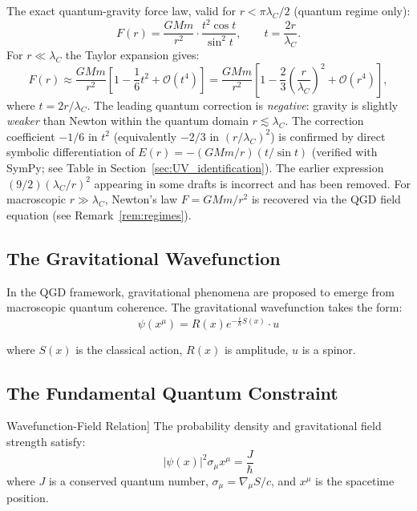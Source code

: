 \documentclass[11pt,a4paper]{article}
\theoremstyle{definition}
\theoremstyle{remark}
\begin{document}
	The exact quantum-gravity force law, valid for $r < \pi\lambda_C/2$ (quantum regime only):
	\begin{equation}
		F(r) = \frac{GMm}{r^2}\cdot\frac{t^2\cos t}{\sin^2 t}, \qquad t = \frac{2r}{\lambda_C}.
	\end{equation}
	For $r \ll \lambda_C$ the Taylor expansion gives:
	\begin{equation}
		F(r) \approx \frac{GMm}{r^2}\left[1 - \frac{1}{6}t^2 + \mathcal{O}(t^4)\right]
		           = \frac{GMm}{r^2}\left[1 - \frac{2}{3}\!\left(\frac{r}{\lambda_C}\right)^{\!2} + \mathcal{O}(r^4)\right],
		\label{eq:F_leading_corrected}
	\end{equation}
	where $t = 2r/\lambda_C$.  The leading quantum correction is \emph{negative}: gravity
	is slightly \emph{weaker} than Newton within the quantum domain $r \lesssim \lambda_C$.
	The correction coefficient $-1/6$ in $t^2$ (equivalently $-2/3$ in $(r/\lambda_C)^2$)
	is confirmed by direct symbolic differentiation of $E(r) = -(GMm/r)(t/\sin t)$
	(verified with SymPy; see Table in Section~\ref{sec:UV_identification}).
	The earlier expression $(9/2)(\lambda_C/r)^2$ appearing in some drafts is incorrect
	and has been removed.
	For macroscopic $r \gg \lambda_C$, Newton's law $F = GMm/r^2$ is recovered via the QGD field equation (see Remark~\ref{rem:regimes}).

	\subsection{The Gravitational Wavefunction}
		
		In the QGD framework, gravitational phenomena are proposed to emerge from macroscopic quantum coherence. The gravitational wavefunction takes the form:
		\begin{equation}\label{eq:wavefunction}
			\psi(x^\mu) = R(x)e^{-\frac{i}{\hbar}S(x)} \cdot u
		\end{equation}
		
		where $S(x)$ is the classical action, $R(x)$ is amplitude, $u$ is a spinor.
		
		\subsection{The Fundamental Quantum Constraint}
		
		Wavefunction-Field Relation]
			The probability density and gravitational field strength satisfy:
			\begin{equation}\label{eq:quantum_constraint}
				\boxed{|\psi(x)|^2 \sigma_\mu x^\mu = \frac{J}{\hbar}}
			\end{equation}
			where $J$ is a conserved quantum number, $\sigma_\mu = \nabla_\mu S/c$, and $x^\mu$ is the spacetime position.
		
\end{document}

